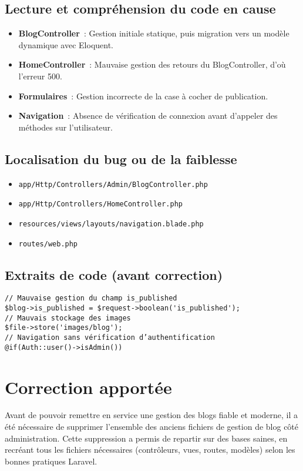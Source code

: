 \documentclass[a4paper,12pt]{report}
\begin{document}
\subsection{Lecture et compréhension du code en cause}
\begin{itemize}
    \item \textbf{BlogController} : Gestion initiale statique, puis migration vers un modèle dynamique avec Eloquent.
    \item \textbf{HomeController} : Mauvaise gestion des retours du BlogController, d’où l’erreur 500.
    \item \textbf{Formulaires} : Gestion incorrecte de la case à cocher de publication.
    \item \textbf{Navigation} : Absence de vérification de connexion avant d’appeler des méthodes sur l’utilisateur.
\end{itemize}

\subsection{Localisation du bug ou de la faiblesse}
\begin{itemize}
    \item \texttt{app/Http/Controllers/Admin/BlogController.php}
    \item \texttt{app/Http/Controllers/HomeController.php}
    \item \texttt{resources/views/layouts/navigation.blade.php}
    \item \texttt{routes/web.php}
\end{itemize}

\subsection{Extraits de code (avant correction)}
\begin{verbatim}
// Mauvaise gestion du champ is_published
$blog->is_published = $request->boolean('is_published');
// Mauvais stockage des images
$file->store('images/blog');
// Navigation sans vérification d’authentification
@if(Auth::user()->isAdmin())
\end{verbatim}

\section{Correction apportée}
Avant de pouvoir remettre en service une gestion des blogs fiable et moderne, il a été nécessaire de supprimer l’ensemble des anciens fichiers de gestion de blog côté administration. Cette suppression a permis de repartir sur des bases saines, en recréant tous les fichiers nécessaires (contrôleurs, vues, routes, modèles) selon les bonnes pratiques Laravel.
\end{document}
